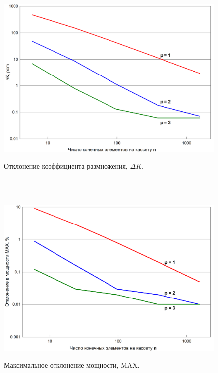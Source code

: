\begin{figure}[H]
	\includegraphics[width=1\linewidth]{KeffErr.png}\\
	\caption{\label{image:canonsummary}Отклонение коэффициента размножения, $\Delta K$.}
	\label{ris:graph2}
\end{figure}
$\phantom{123}$\\\\
\begin{figure}[H]
	\includegraphics[width=0.9\linewidth]{MaxErr.png}\\
	\caption{\label{image:canonsummary}Максимальное отклонение мощности, MAX.}
	\label{ris:graph3}
\end{figure}

